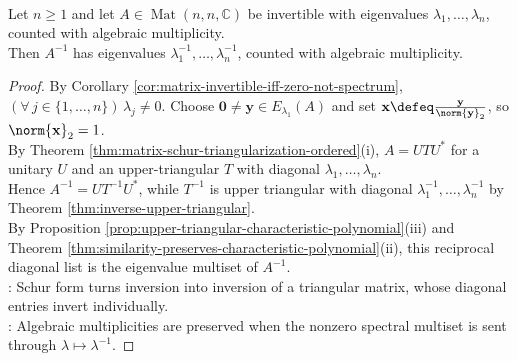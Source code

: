 \begin{corollary} \label{cor:eigenvalues-of-inverse-matrix} \\
Let $n\geq1$ and let $A\in\operatorname{Mat}(n,n,\mathbb{C})$ be invertible with eigenvalues $\lambda_1,\ldots,\lambda_n$, counted with algebraic multiplicity.\\
Then $A^{-1}$ has eigenvalues $\lambda_1^{-1},\ldots,\lambda_n^{-1}$, counted with algebraic multiplicity.
\begin{proof}
By Corollary \ref{cor:matrix-invertible-iff-zero-not-spectrum}, $(\forall\,j\in\{1,\ldots,n\})\,\lambda_j\neq0$. Choose $\mathbf{0}\neq\mathbf{y}\in E_{\lambda_1}(A)$ and set $\mathbf{x}\defeq\frac{\mathbf{y}}{\norm{\mathbf{y}}_2}$, so $\norm{\mathbf{x}}_2=1$.\\
By Theorem \ref{thm:matrix-schur-triangularization-ordered}(i), $A=UTU^*$ for a unitary $U$ and an upper-triangular $T$ with diagonal $\lambda_1,\ldots,\lambda_n$.\\
Hence $A^{-1}=UT^{-1}U^*$, while $T^{-1}$ is upper triangular with diagonal $\lambda_1^{-1},\ldots,\lambda_n^{-1}$ by Theorem \ref{thm:inverse-upper-triangular}.\\
By Proposition \ref{prop:upper-triangular-characteristic-polynomial}(iii) and Theorem \ref{thm:similarity-preserves-characteristic-polynomial}(ii), this reciprocal diagonal list is the eigenvalue multiset of $A^{-1}$.\\
: Schur form turns inversion into inversion of a triangular matrix, whose diagonal entries invert individually.\\
: Algebraic multiplicities are preserved when the nonzero spectral multiset is sent through $\lambda\mapsto\lambda^{-1}$.
\end{proof}
\end{corollary}


